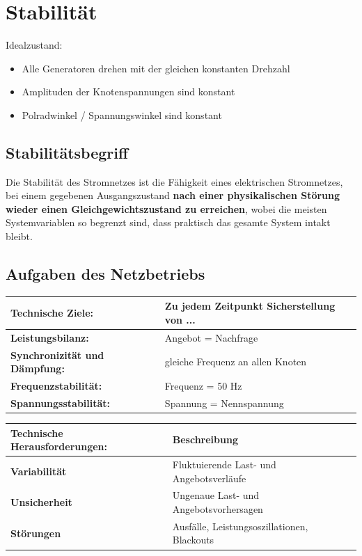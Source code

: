 \section{Stabilität}
    Idealzustand:
    \begin{itemize}
        \item Alle Generatoren drehen mit der gleichen konstanten Drehzahl
        \item Amplituden der Knotenspannungen sind konstant
        \item Polradwinkel / Spannungswinkel sind konstant
    \end{itemize}
\subsection{Stabilitätsbegriff}
    Die Stabilität des Stromnetzes ist die Fähigkeit eines elektrischen Stromnetzes, bei einem gegebenen Ausgangszustand \textbf{nach einer physikalischen Störung wieder einen Gleichgewichtszustand zu erreichen}, wobei die meisten Systemvariablen so begrenzt sind, dass praktisch das gesamte System intakt bleibt.

\subsection{Aufgaben des Netzbetriebs}
    \begin{tabular}{l l}
        \toprule[.13em]
        \textbf{{Technische Ziele:}} & \textbf{{Zu jedem Zeitpunkt Sicherstellung von ...}} \\
        \midrule
        \textbf{Leistungsbilanz:} & Angebot = Nachfrage \\
        \textbf{Synchronizität und Dämpfung:} & gleiche Frequenz an allen Knoten \\
        \textbf{Frequenzstabilität:} & Frequenz = 50 Hz \\
        \textbf{Spannungsstabilität:} & Spannung = Nennspannung \\
        \bottomrule[.13em]
    \end{tabular}

    \vspace{0.15cm}

    \begin{tabular}{l l}
        \toprule[.13em]
        \textbf{Technische Herausforderungen:} & \textbf{Beschreibung} \\
        \midrule
        \textbf{Variabilität} & Fluktuierende Last- und Angebotsverläufe \\
        \textbf{Unsicherheit} & Ungenaue Last- und Angebotsvorhersagen \\
        \textbf{Störungen} & Ausfälle, Leistungsoszillationen, Blackouts \\
        \bottomrule[.13em]
    \end{tabular}

